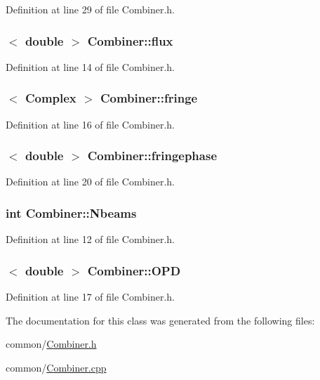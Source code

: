 Definition at line 29 of file Combiner.h.

\hypertarget{classCombiner_a408d595f014d41fd6b31eda9916067bb}{
\subsubsection[{flux}]{$<$ double $>$ {\bf Combiner::flux}}}
\label{classCombiner_a408d595f014d41fd6b31eda9916067bb}


Definition at line 14 of file Combiner.h.

\hypertarget{classCombiner_ad60574dad3bc9de3c4c317ebdcdedaf1}{
\subsubsection[{fringe}]{$<$ {\bf Complex} $>$ {\bf Combiner::fringe}}}
\label{classCombiner_ad60574dad3bc9de3c4c317ebdcdedaf1}


Definition at line 16 of file Combiner.h.

\hypertarget{classCombiner_ab5bcedbadbe41f1887953228fd1df77d}{
\subsubsection[{fringephase}]{$<$ double $>$ {\bf Combiner::fringephase}}}
\label{classCombiner_ab5bcedbadbe41f1887953228fd1df77d}


Definition at line 20 of file Combiner.h.

\hypertarget{classCombiner_a4e7f1498813ae735a155eee97da2a7e5}{
\subsubsection[{Nbeams}]{\setlength{\rightskip}{0pt plus 5cm}int {\bf Combiner::Nbeams}}}
\label{classCombiner_a4e7f1498813ae735a155eee97da2a7e5}


Definition at line 12 of file Combiner.h.

\hypertarget{classCombiner_ae0a2d5921b449ebe0c96f5ca9b817ce4}{
\subsubsection[{OPD}]{$<$ double $>$ {\bf Combiner::OPD}}}
\label{classCombiner_ae0a2d5921b449ebe0c96f5ca9b817ce4}


Definition at line 17 of file Combiner.h.



The documentation for this class was generated from the following files:\begin{DoxyCompactItemize}
\item 
common/\hyperlink{Combiner_8h}{Combiner.h}\item 
common/\hyperlink{Combiner_8cpp}{Combiner.cpp}\end{DoxyCompactItemize}
